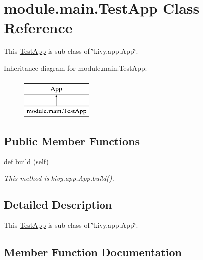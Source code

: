 \hypertarget{classmodule_1_1main_1_1_test_app}{}\section{module.\+main.\+Test\+App Class Reference}
\label{classmodule_1_1main_1_1_test_app}


This \mbox{\hyperlink{classmodule_1_1main_1_1_test_app}{Test\+App}} is sub-\/class of \char`\"{}kivy.\+app.\+App\char`\"{}.  


Inheritance diagram for module.\+main.\+Test\+App\+:\begin{figure}[H]
\begin{center}
\leavevmode
\includegraphics[height=2.000000cm]{classmodule_1_1main_1_1_test_app}
\end{center}
\end{figure}
\subsection*{Public Member Functions}
\begin{DoxyCompactItemize}
\item 
def \mbox{\hyperlink{classmodule_1_1main_1_1_test_app_a56f9c311e4db9ec9a313687f4c6d5faf}{build}} (self)
\begin{DoxyCompactList}\small\item\em This method is kivy.\+app.\+App.\+build(). \end{DoxyCompactList}\end{DoxyCompactItemize}


\subsection{Detailed Description}
This \mbox{\hyperlink{classmodule_1_1main_1_1_test_app}{Test\+App}} is sub-\/class of \char`\"{}kivy.\+app.\+App\char`\"{}. 

\subsection{Member Function Documentation}
\mbox{\label{classmodule_1_1main_1_1_test_app_a56f9c311e4db9ec9a313687f4c6d5faf}} 
